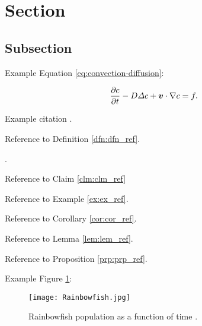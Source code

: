 \section{Section}\label{sse:Section}

\subsection{Subsection}\label{sss:Subsection}

Example Equation \eqref{eq:convection-diffusion}:

\begin{equation}\label{eq:convection-diffusion}
    \frac{\p c}{\p t} - D \Delta c + \mathbfit{v}\cdot\nabla c = f.
\end{equation}

Example citation \citep{baarslag2015learning}.


Reference to Definition \ref{dfn:dfn_ref}.


.


Reference to Claim \ref{clm:clm_ref}


Reference to Example \ref{ex:ex_ref}.




Reference to Corollary \ref{cor:cor_ref}.


Reference to Lemma \ref{lem:lem_ref}.


Reference to Proposition \ref{prp:prp_ref}.

\newpage

Example Figure \ref{fig:Rainbowfish}:
\begin{figure}[H]
    \centering
    \texttt{[image: Rainbowfish.jpg]}
    \caption[Rainbowfish population as a function of time]{Rainbowfish population as a function of time \citep{tudelftopencourseware}.}
    \label{fig:Rainbowfish}
\end{figure}

